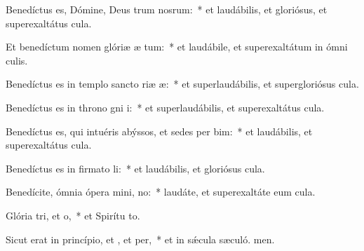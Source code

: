 \item Benedíctus es, Dómine, Deus trum nosrum:~* et laudábilis, et gloriósus, et superexaltátus  cula.

\item Et benedíctum nomen glóriæ æ tum:~* et laudábile, et superexaltátum in ómni culis.

\item Benedíctus es in templo sancto riæ æ:~* et superlaudábilis, et supergloriósus  cula.

\item Benedíctus es in throno gni i:~* et superlaudábilis, et superexaltátus  cula.

\item Benedíctus es, qui intuéris abýssos, et sedes per bim:~* et laudábilis, et superexaltátus  cula.

\item Benedíctus es in firmato li:~* et laudábilis, et gloriósus  cula.

\item Benedícite, ómnia ópera mini, no:~* laudáte, et superexaltáte eum  cula.

\item Glória tri, et o,~* et Spirítu to.

\item Sicut erat in princípio, et , et per,~* et in sǽcula sæculó. men.